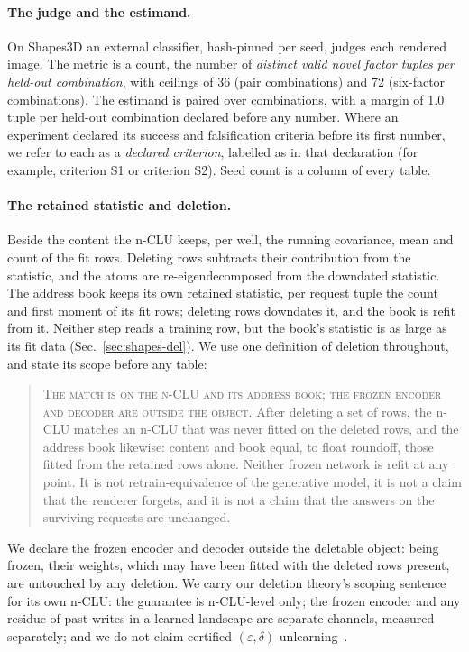 \documentclass{article} %
\begin{document}
\paragraph{The judge and the estimand.} On Shapes3D an external classifier, hash-pinned per seed, judges each rendered image. The metric is a count, the number of \emph{distinct
valid novel factor tuples per held-out combination}, with ceilings of 36 (pair combinations) and 72 (six-factor
combinations). The estimand is paired over combinations, with a margin of 1.0 tuple per held-out combination declared
before any number. %
Where an experiment declared its success and falsification criteria before its first
number, we refer to each as a \emph{declared criterion}, labelled as in that
declaration (for example, criterion S1 or criterion S2).
Seed count is a column of every table.

\paragraph{The retained statistic and deletion.} Beside the content the n-CLU keeps, per
well, the running covariance, mean and count of the fit rows. Deleting rows subtracts their
contribution from the statistic, and the atoms are re-eigendecomposed from the downdated
statistic. The address book keeps its own retained statistic, per request tuple the count and first
moment of its fit rows; deleting rows downdates it, and the book is refit from it. Neither step
reads a training row, but the book's statistic is as large as its fit data
(Sec.~\ref{sec:shapes-del}). We use one definition of deletion throughout, and state its scope
before any table:

\begin{quote}\small
\textsc{The match is on the n-CLU and its address book; the frozen encoder and decoder are outside
the object.} After deleting a set of rows, the n-CLU matches an n-CLU that was never fitted on the
deleted rows, and the address book likewise: content and book equal, to float roundoff, those fitted
from the retained rows alone. Neither frozen network is refit at any point. It is
not retrain-equivalence of the generative model, it is not a claim that the renderer forgets, and it
is not a claim that the answers on the surviving requests are unchanged.
\end{quote}

\noindent We declare the frozen encoder and decoder outside the deletable object: being frozen,
their weights, which may have been fitted with the deleted rows present, are untouched by any deletion.
We carry our deletion theory's scoping sentence for its own n-CLU: the guarantee
is n-CLU-level only; the frozen encoder and any residue of past writes in a learned
landscape are separate channels, measured separately; and we do not claim certified
$(\varepsilon,\delta)$ unlearning~\citep{guo_certified_2023}. %
\end{document}
